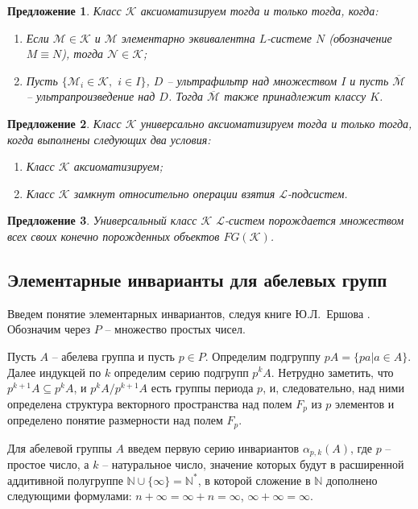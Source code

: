 \documentclass[a4paper,11pt,twoside]{article}
\newtheorem{proposition}{Предложение}[section]
\def\K{{\mathcal{K}}}
\def\L{{\mathcal{L}}}
\def\N{{\mathbb{N}}}
\begin{document}
\begin{proposition}\label{prop:AxiomClass}
Класс $\K$ аксиоматизируем тогда и только тогда, когда:
\begin{enumerate}
\item Если $\mathcal{M} \in \K$ и $\mathcal{M}$ элементарно эквивалентна $L$-системе $N$ (обозначение $M \equiv N$), тогда $\mathcal{N} \in \K$;
\item Пусть $\{\mathcal{M}_i \in \K,$ $i \in I\}$, $D$ -- ультрафильтр над множеством $I$ и пусть $\overline{\mathcal{M}}$ -- ультрапроизведение над $D$. Тогда $\overline{\mathcal{M}}$ также принадлежит классу $K$.
\end{enumerate}
\end{proposition}

\begin{proposition}\label{prop:AxiomClass2}
Класс $\K$ универсально аксиоматизируем тогда и только тогда, когда выполнены следующих два условия:
\begin{enumerate}
\item Класс $\K$ аксиоматизируем;
\item Класс $\K$ замкнут относительно операции взятия $\L$-подсистем.
\end{enumerate}
\end{proposition}

\begin{proposition}\label{prop:ClassGeneratesFinetObjects}
Универсальный класс $\K$ $\L$-систем порождается множеством всех своих конечно порожденных объектов $FG(\K)$.
\end{proposition}

\subsection{Элементарные инварианты для абелевых групп}\label{sec:UnivInvariants}

Введем понятие элементарных инвариантов, следуя книге Ю.Л.~Ершова \cite{Ershov}. Обозначим через $P$ -- множество простых чисел.

Пусть $A$ -- абелева группа и пусть $p \in P$. Определим подгруппу $pA = \{ pa | a \in A\}$. Далее индукцей по $k$ определим серию подгрупп $p^k A$. Нетрудно заметить, что $p^{k+1} A \subseteq p^k A$, и $p^k A \Big/ p^{k+1} A$ есть группы периода $p$, и, следовательно, над ними определена структура векторного пространства над полем $F_p$ из $p$ элементов и определено понятие размерности над полем $F_p$.

Для абелевой группы $A$ введем первую серию инвариантов $\alpha_{p,k}(A)$, где $p$ -- простое число, а $k$ -- натуральное число, значение которых будут в расширенной аддитивной полугруппе $\N \cup \{\infty \} = \N^*$, в которой сложение в $\N$ дополнено следующими формулами: $n + \infty = \infty + n = \infty$, $\infty + \infty = \infty$.
\end{document}

